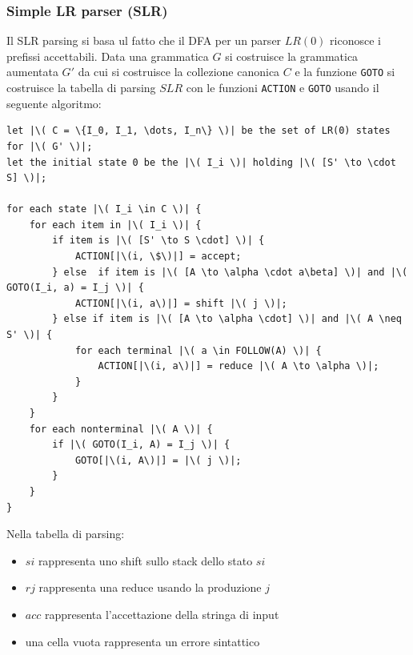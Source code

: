 \documentclass[a4paper]{article}
\begin{document}
\subsubsection{Simple LR parser (SLR)}
Il SLR parsing si basa ul fatto che il DFA per un parser \( LR(0) \) riconosce i
prefissi accettabili.
Data una grammatica \( G \) si costruisce la grammatica aumentata \( G' \)
da cui si costruisce la collezione canonica \( C \) e la funzione \texttt{GOTO}
si costruisce la tabella di parsing \( SLR \) con le funzioni \texttt{ACTION} e
\texttt{GOTO} usando il seguente algoritmo:
\begin{lstlisting}[escapechar=|, basicstyle=\rmfamily, columns=fullflexible, keepspaces=true]
let |\( C = \{I_0, I_1, \dots, I_n\} \)| be the set of LR(0) states for |\( G' \)|;
let the initial state 0 be the |\( I_i \)| holding |\( [S' \to \cdot S] \)|;

for each state |\( I_i \in C \)| {
    for each item in |\( I_i \)| {
        if item is |\( [S' \to S \cdot] \)| {
            ACTION[|\(i, \$\)|] = accept;
        } else  if item is |\( [A \to \alpha \cdot a\beta] \)| and |\( GOTO(I_i, a) = I_j \)| {
            ACTION[|\(i, a\)|] = shift |\( j \)|;
        } else if item is |\( [A \to \alpha \cdot] \)| and |\( A \neq S' \)| {
            for each terminal |\( a \in FOLLOW(A) \)| {
                ACTION[|\(i, a\)|] = reduce |\( A \to \alpha \)|;
            }
        }
    }
    for each nonterminal |\( A \)| {
        if |\( GOTO(I_i, A) = I_j \)| {
            GOTO[|\(i, A\)|] = |\( j \)|;
        }
    }
}
\end{lstlisting}
\noindent
Nella tabella di parsing:
\begin{itemize}
  \item \( si \) rappresenta uno shift sullo stack dello stato \( si \) 
  \item \( rj \) rappresenta una reduce usando la produzione \( j \)
  \item \( acc \) rappresenta l'accettazione della stringa di input
  \item una cella vuota rappresenta un errore sintattico
\end{itemize}
\end{document}
